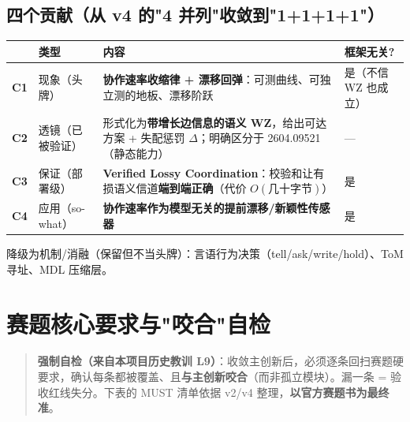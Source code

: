 \documentclass[UTF8,fontset=windows,11pt]{ctexart}
\begin{document}
\subsection{四个贡献（从 v4 的"4 并列"收敛到"1+1+1+1"）}
\begin{table}[h]\small\centering
\renewcommand{\arraystretch}{1.25}
\begin{tabularx}{\linewidth}{@{}p{0.8cm}p{1.8cm}Y p{1.7cm}@{}}
\toprule
 & \textbf{类型} & \textbf{内容} & \textbf{框架无关?} \\
\midrule
\textbf{C1} & 现象（头牌） & \textbf{协作速率收缩律 + 漂移回弹}：可测曲线、可独立测的地板、漂移阶跃 & 是（不信 WZ 也成立） \\
\textbf{C2} & 透镜（已被验证） & 形式化为\textbf{带增长边信息的语义 WZ}，给出可达方案 + 失配惩罚 $\Delta$；明确区分于 2604.09521（静态能力） & --- \\
\textbf{C3} & 保证（部署级） & \textbf{Verified Lossy Coordination}：校验和让有损语义信道\textbf{端到端正确}（代价 $O(\text{几十字节})$） & 是 \\
\textbf{C4} & 应用（so-what） & \textbf{协作速率作为模型无关的提前漂移/新颖性传感器} & 是 \\
\bottomrule
\end{tabularx}
\end{table}

\noindent 降级为机制/消融（保留但不当头牌）：言语行为决策（tell/ask/write/hold）、ToM 寻址、MDL 压缩层。

\section{赛题核心要求与"咬合"自检}

\begin{quote}\small
\textbf{强制自检（来自本项目历史教训 L9）}：收敛主创新后，必须逐条回扫赛题硬要求，确认每条都被覆盖、且\textbf{与主创新咬合}（而非孤立模块）。漏一条 = 验收红线失分。下表的 MUST 清单依据 v2/v4 整理，\textbf{以官方赛题书为最终准}。
\end{quote}
\end{document}
